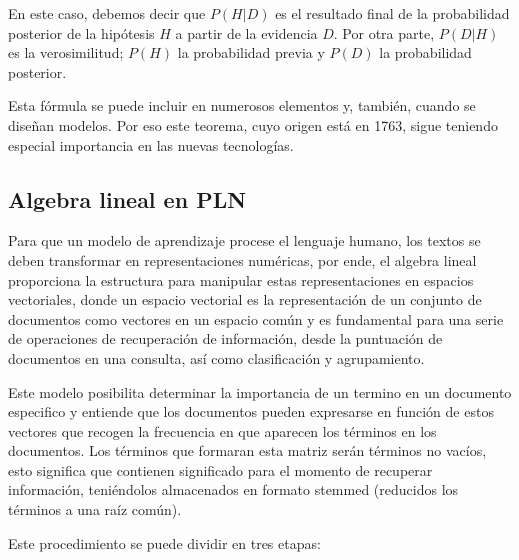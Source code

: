 En este caso, debemos decir que $P(H|D)$ es el resultado final de la probabilidad posterior de la hipótesis $H$ a partir de la evidencia $D$. Por otra parte, $P(D|H)$ es la verosimilitud; $P(H)$ la probabilidad previa y $P(D)$ la probabilidad posterior.

Esta fórmula se puede incluir en numerosos elementos y, también, cuando se diseñan modelos. Por eso este teorema, cuyo origen está en 1763, sigue teniendo especial importancia en las nuevas tecnologías.

\subsection{Algebra lineal en PLN}

Para que un modelo de aprendizaje procese el lenguaje humano, los textos se deben transformar en representaciones numéricas, por ende, el algebra lineal proporciona la estructura para manipular estas representaciones en espacios vectoriales, donde un espacio vectorial es la representación de un conjunto de documentos como vectores en un espacio común y es fundamental para una serie de operaciones de recuperación de información, desde la puntuación de documentos en una consulta, así como clasificación y agrupamiento.

Este modelo posibilita determinar la importancia de un termino en un documento especifico y entiende que los documentos pueden expresarse en función de estos vectores que recogen la frecuencia en que aparecen los términos en los documentos. Los términos que formaran esta matriz serán términos no vacíos, esto significa que contienen significado para el momento de recuperar información, teniéndolos almacenados en formato stemmed (reducidos los términos a una raíz común).

Este procedimiento se puede dividir en tres etapas:

